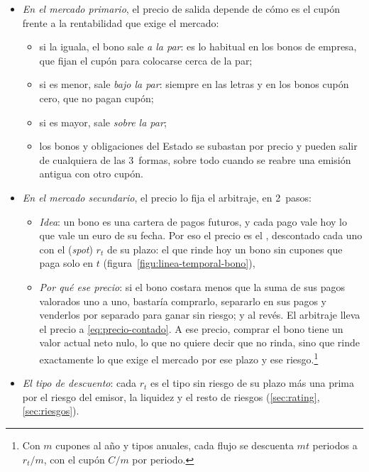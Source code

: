 \documentclass[11pt]{article}
\begin{document}
\begin{itemize}
\item \emph{En el mercado primario}, el precio de salida depende de cómo es el cupón frente a la rentabilidad que exige el mercado:
  \begin{itemize}
  \item si la iguala, el bono sale \emph{a la par}: es lo habitual en los bonos de empresa, que fijan el cupón para colocarse cerca de la par;
  \item si es menor, sale \emph{bajo la par}: siempre en las letras y en los bonos cupón cero, que no pagan cupón;
  \item si es mayor, sale \emph{sobre la par};
  \item los bonos y obligaciones del Estado se subastan por precio y pueden salir de cualquiera de las 3~formas, sobre todo cuando se reabre una emisión antigua con otro cupón.
  \end{itemize}
\item \emph{En el mercado secundario}, el precio lo fija el arbitraje, en 2~pasos:
  \begin{itemize}
  \item \emph{Idea}: un bono es una cartera de pagos futuros, y cada pago vale hoy lo que vale un euro de su fecha. Por eso el precio es el , descontado cada uno con el  (\emph{spot}) $r_t$ de su plazo: el que rinde hoy un bono sin cupones que paga solo en $t$ (figura~\ref{figu:linea-temporal-bono}),
  \item \emph{Por qué ese precio}: si el bono costara menos que la suma de sus pagos valorados uno a uno, bastaría comprarlo, separarlo en sus pagos y venderlos por separado para ganar sin riesgo; y al revés. El arbitraje lleva el precio a \eqref{eq:precio-contado}. A ese precio, comprar el bono tiene un valor actual neto nulo, lo que no quiere decir que no rinda, sino que rinde exactamente lo que exige el mercado por ese plazo y ese riesgo.\footnote{Con $m$ cupones al año y tipos anuales, cada flujo se descuenta $mt$ periodos a $r_t/m$, con el cupón $C/m$ por periodo.}
  \end{itemize}
\item \emph{El tipo de descuento}: cada $r_t$ es el tipo sin riesgo de su plazo más una prima por el riesgo del emisor, la liquidez y el resto de riesgos (\ref{sec:rating}, \ref{sec:riesgos}).

\end{itemize}
\end{document}
